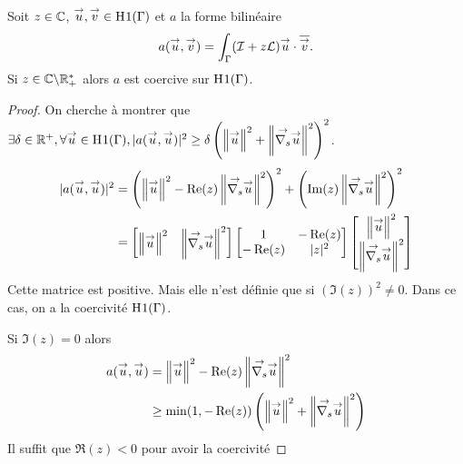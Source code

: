     \begin{lemme}
    \label{lem:coercivite:operateur-l}
      Soit \(z\in \CC\), \(\vu,\vv \in \Sobolev[1]{(\Gamma)}\) et \(a\) la forme bilinéaire
      \begin{equation*}
        a(\vect{u},\vect{v}) = \int_\Gamma(\oI + z\LL)\vect{u}\cdot\conj{\vect{v}}.
      \end{equation*}
      Si \(z\in \CC\backslash \RR_+^*\) alors \(a\) est coercive sur \(\Sobolev[1]{(\Gamma)}\).
    \end{lemme}
    \begin{proof}
      On cherche à montrer que \(\exists \delta \in \RR^+, \forall \vu \in \Sobolev[1]{(\Gamma)}, |a(\vu,\vu)|^2\ge \delta\left(\norm{\vu}^2+\norm{\vgrads{\vu}}^2\right)^2\).
      \begin{align*}
        |a(\vect{u},\vect{u})|^2 &= \left(\norm{\vu}^2-\Re(z)\norm{\vgrads{\vu}}^2\right)^2 + \left(\Im(z)\norm{\vgrads{\vu}}^2\right)^2
        \\
        &= \begin{bmatrix}
          \norm{\vu}^2
          &
          \norm{\vgrads{\vu}}^2
        \end{bmatrix}
        \begin{bmatrix}
          1 & - \Re(z)
          \\
          -\Re(z) & |z|^2
        \end{bmatrix}
        \begin{bmatrix}
          \norm{\vu}^2
          \\
          \norm{\vgrads{\vu}}^2
        \end{bmatrix}
        \\
      \end{align*}
      Cette matrice est positive. Mais elle n'est définie que si \((\Im(z))^2\not=0\). Dans ce cas, on a la coercivité \(\Sobolev[1]{(\Gamma})\).

      Si \(\Im(z)=0\) alors
      \begin{align*}
        a(\vect{u},\vect{u}) &= \norm{\vu}^2-\Re(z)\norm{\vgrads{\vu}}^2
        \\
        &\ge \min(1,-\Re(z))\left(\norm{\vu}^2+\norm{\vgrads{\vu}}^2\right)
      \end{align*}
      Il suffit que \(\Re(z) < 0 \) pour avoir la coercivité
    \end{proof}

